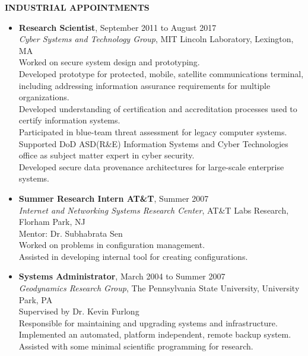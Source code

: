 \documentclass[10pt]{article}
\begin{document}
\vspace{1em} {\Large \textbf{INDUSTRIAL APPOINTMENTS}}
\begin{itemize}
\item \textbf{Research Scientist}, September 2011 to August 2017\\
  \textit{Cyber Systems and Technology Group}, MIT Lincoln Laboratory, Lexington, MA\\
  Worked on secure system design and prototyping.\\
  Developed prototype for protected, mobile, satellite communications terminal, including addressing information assurance requirements for multiple organizations.\\
  Developed understanding of certification and accreditation processes used to certify information systems.\\
  Participated in blue-team threat assessment for legacy computer systems.\\
  Supported DoD ASD(R\&E) Information Systems and Cyber Technologies office as subject matter expert in cyber security.\\
  Developed secure data provenance architectures for large-scale enterprise systems.\\
  
\item \textbf{Summer Research Intern AT\&T}, Summer 2007\\
  \textit{Internet and Networking Systems Research Center}, AT\&T Labs
  Research,
  Florham Park, NJ\\
  Mentor: Dr. Subhabrata Sen\\
  Worked on problems in configuration management.\\
  Assisted in developing internal tool for creating configurations.

\item \textbf{Systems Administrator}, March 2004 to Summer 2007\\
  \textit{Geodynamics Research Group}, The Pennsylvania State University,
  University Park, PA\\
  Supervised by Dr. Kevin Furlong\\
  Responsible for maintaining and upgrading systems and
  infrastructure.\\
  Implemented an automated, platform independent, remote backup
  system.\\
  Assisted with some minimal scientific programming for research.
\end{itemize}
\end{document}
